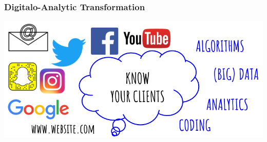 \begin{frame}
\frametitle{Digitalo-Analytic Transformation}
\vskip 1.0cm
\vspace{0.5cm}\includegraphics[width=1.00\textwidth]{./pictures/knowClients.png}
\end{frame}

